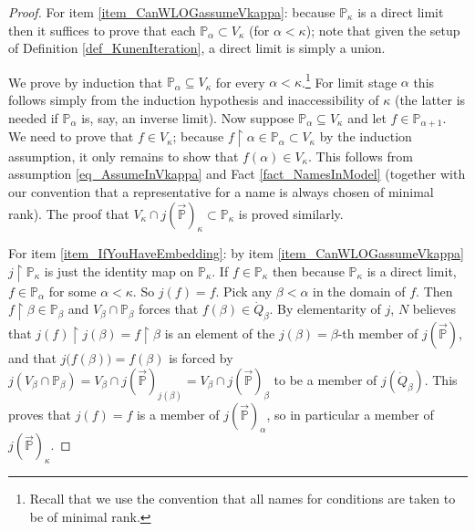 \documentclass{amsart}
\begin{document}
\begin{proof}
For item \ref{item_CanWLOGassumeVkappa}:  because $\mathbb{P}_\kappa$ is a direct limit then it suffices to prove that each $\mathbb{P}_\alpha \subset V_\kappa$ (for $\alpha < \kappa$); note that given the setup of Definition \ref{def_KunenIteration}, a direct limit is simply a union.  

We prove by induction that $\mathbb{P}_\alpha \subseteq V_\kappa$ for every $\alpha < \kappa$.\footnote{Recall that we use the convention that all names for conditions are taken to be of minimal rank.}  For limit stage $\alpha$ this follows simply from the induction hypothesis and inaccessibility of $\kappa$ (the latter is needed if $\mathbb{P}_\alpha$ is, say, an inverse limit).  Now suppose $\mathbb{P}_\alpha \subseteq V_\kappa$ and let $f \in \mathbb{P}_{\alpha+1}$.  We need to prove that $f \in V_\kappa$; because $f \restriction \alpha \in \mathbb{P}_\alpha \subset V_\kappa$ by the induction assumption, it only remains to show that $f(\alpha) \in V_\kappa$.  This follows from assumption \eqref{eq_AssumeInVkappa} and Fact \ref{fact_NamesInModel} (together with our convention that a representative for a name is always chosen of minimal rank).  The proof that $V_\kappa \cap j(\vec{\mathbb{P}})_\kappa \subset \mathbb{P}_\kappa$ is proved similarly.

For item \ref{item_IfYouHaveEmbedding}: by item \ref{item_CanWLOGassumeVkappa} $j \restriction \mathbb{P}_\kappa$ is just the identity map on $\mathbb{P}_\kappa$. If $f \in \mathbb{P}_\kappa$ then because $\mathbb{P}_\kappa$ is a direct limit, $f \in \mathbb{P}_\alpha$ for some $\alpha < \kappa$.   So $j(f) = f$.  Pick any $\beta < \alpha$ in the domain of $f$.  Then $f \restriction \beta \in \mathbb{P}_\beta$ and $V_\beta \cap \mathbb{P}_\beta$ forces that $f(\beta) \in \dot{Q}_\beta$.  By elementarity of $j$, $N$ believes that $j(f) \restriction j(\beta) = f \restriction \beta$ is an element of the $j(\beta) = \beta$-th member of $j(\vec{\mathbb{P}})$, and that $j\big( f(\beta) \big) = f(\beta)$ is forced by $j(V_\beta \cap \mathbb{P}_\beta) = V_\beta \cap j(\vec{\mathbb{P}})_{j(\beta)} = V_\beta \cap j(\vec{\mathbb{P}})_{\beta} $ to be a member of $j(\dot{Q}_\beta)$.  This proves that $j(f) = f$ is a member of $j(\vec{\mathbb{P}})_\alpha$, so in particular a member of $j(\vec{\mathbb{P}})_\kappa$.


\end{proof}
\end{document}
